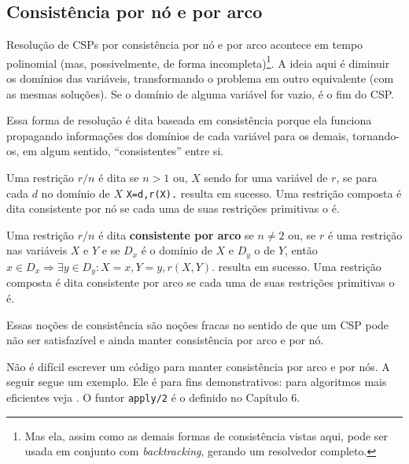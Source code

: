 \documentclass{article}
\begin{document}
\subsection{Consistência por nó e por arco}

Resolução de CSPs por consistência por nó e por arco acontece em tempo polinomial
(mas, possivelmente, de forma incompleta)\footnote{Mas ela, assim como as demais formas de consistência vistas aqui,
 pode ser usada em conjunto com \textit{backtracking}, gerando um resolvedor completo.}.
A ideia aqui é diminuir os domínios das variáveis,
transformando o problema em outro equivalente (com as mesmas soluções).
Se o domínio de alguma variável for vazio, é o fim do CSP.

Essa forma de resolução é dita baseada em consistência porque ela funciona propagando informações dos domínios de cada variável
para os demais, tornando-os, em algum sentido, ``consistentes'' entre si.

\begin{definition}
  Uma restrição $r/n$ é dita 
  se $n > 1$ ou, $X$ sendo for uma variável de $r$, se para cada $d$ no domínio
  de $X$ {\tt  X=d,r(X).} resulta em sucesso.
  Uma restrição composta é dita consistente por nó se cada uma de suas restrições
  primitivas o é.
\end{definition}

\begin{definition}
  Uma restrição $r/n$ é dita \textbf{consistente por arco} se
  $n \neq 2$ ou, se $r$ é uma restrição nas variáveis $X$ e $Y$ e se $D_x$ é o domínio de $X$ e $D_y$ o
  de $Y$, então $x \in D_x \Rightarrow \exists y \in D_y : X=x, Y=y, r(X,Y).$ %
  resulta em sucesso.
  Uma restrição composta é dita consistente por arco se cada uma de suas restrições primitivas o é.
\end{definition}

Essas noções de consistência são noções fracas no sentido de que um CSP pode não ser satisfazível
e ainda manter consistência por arco e por nó.

Não é difícil escrever um código para manter consistência por arco e por nós. A seguir segue um exemplo. Ele é para fins
demonstrativos: para algoritmos mais eficientes veja \cite{tsang}. O funtor {\tt apply/2} é o definido no Capítulo 6.

\label{lst:no_consistency}
\vspace{2cm}
\end{document}
